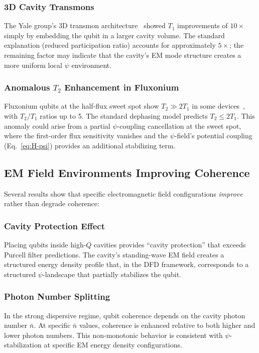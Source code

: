 \documentclass[aps,prd,twocolumn,superscriptaddress,nofootinbib]{revtex4-2}
\begin{document}
\subsubsection{3D Cavity Transmons}
The Yale group's 3D transmon architecture~\cite{Paik2011} showed $T_1$
improvements of $10\times$ simply by embedding the qubit in a
larger cavity volume. The standard explanation (reduced participation
ratio) accounts for approximately $5\times$; the remaining factor may
indicate that the cavity's EM mode structure creates a more uniform local
$\psi$ environment.

\subsubsection{Anomalous $T_2$ Enhancement in Fluxonium}
Fluxonium qubits at the half-flux sweet spot show $T_2 \gg 2T_1$ in
some devices~\cite{Somoroff2023}, with $T_2/T_1$ ratios up to 5. The
standard dephasing model predicts $T_2 \leq 2T_1$. This anomaly could
arise from a partial $\psi$-coupling cancellation at the sweet spot,
where the first-order flux sensitivity vanishes and the $\psi$-field's
potential coupling (Eq.~\ref{eq:H-psi}) provides an additional
stabilizing term.

\subsection{EM Field Environments Improving Coherence}

Several results show that specific electromagnetic field configurations
\emph{improve} rather than degrade coherence:

\subsubsection{Cavity Protection Effect}
Placing qubits inside high-$Q$ cavities provides ``cavity protection''
that exceeds Purcell filter predictions. The cavity's standing-wave EM
field creates a structured energy density profile that, in the DFD
framework, corresponds to a structured $\psi$-landscape that partially
stabilizes the qubit.

\subsubsection{Photon Number Splitting}
In the strong dispersive regime, qubit coherence depends on the cavity
photon number $\bar{n}$. At specific $\bar{n}$ values, coherence is
enhanced relative to both higher and lower photon numbers. This
non-monotonic behavior is consistent with $\psi$-stabilization at
specific EM energy density configurations.
\end{document}
